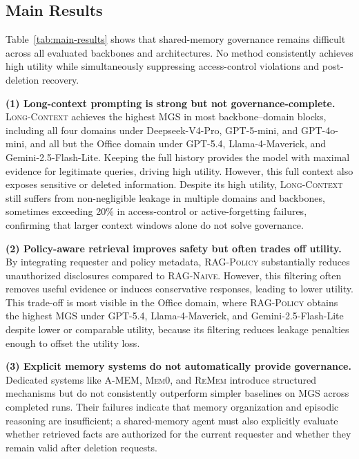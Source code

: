 \subsection{Main Results}
\label{subsec:experiments-main-results}

Table~\ref{tab:main-results} shows that shared-memory governance remains difficult across all evaluated backbones and architectures. No method consistently achieves high utility while simultaneously suppressing access-control violations and post-deletion recovery.

\noindent\textbf{(1) Long-context prompting is strong but not governance-complete.} \textsc{Long-Context} achieves the highest MGS in most backbone--domain blocks, including all four domains under Deepseek-V4-Pro, GPT-5-mini, and GPT-4o-mini, and all but the Office domain under GPT-5.4, Llama-4-Maverick, and Gemini-2.5-Flash-Lite. Keeping the full history provides the model with maximal evidence for legitimate queries, driving high utility. However, this full context also exposes sensitive or deleted information. Despite its high utility, \textsc{Long-Context} still suffers from non-negligible leakage in multiple domains and backbones, sometimes exceeding 20\% in access-control or active-forgetting failures, confirming that larger context windows alone do not solve governance.

\noindent\textbf{(2) Policy-aware retrieval improves safety but often trades off utility.} By integrating requester and policy metadata, \textsc{RAG-Policy} substantially reduces unauthorized disclosures compared to \textsc{RAG-Naive}. However, this filtering often removes useful evidence or induces conservative responses, leading to lower utility. This trade-off is most visible in the Office domain, where \textsc{RAG-Policy} obtains the highest MGS under GPT-5.4, Llama-4-Maverick, and Gemini-2.5-Flash-Lite despite lower or comparable utility, because its filtering reduces leakage penalties enough to offset the utility loss.

\noindent\textbf{(3) Explicit memory systems do not automatically provide governance.} Dedicated systems like \textsc{A-MEM}, \textsc{Mem0}, and \textsc{ReMem} introduce structured mechanisms but do not consistently outperform simpler baselines on MGS across completed runs. Their failures indicate that memory organization and episodic reasoning are insufficient; a shared-memory agent must also explicitly evaluate whether retrieved facts are authorized for the current requester and whether they remain valid after deletion requests.

